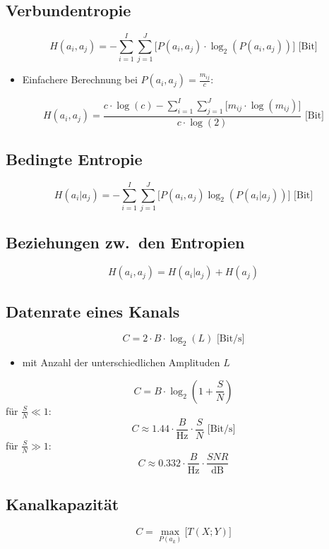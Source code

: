 
\subsection*{Verbundentropie}
\[
    H(a_i, a_j) = -\sum_{i=1}^{I} \sum_{j=1}^{J} \bigg[ P(a_i, a_j) \cdot
    \log_2( P(a_i, a_j) ) \bigg] \mbox{ [Bit]}
\]
\begin{itemize}
	\setlength{\parskip}{0pt}
	\setlength{\itemsep}{0pt plus 1pt}
    \item Einfachere Berechnung bei $P(a_i, a_j) = \frac{m_{ij}}{c}$:
\end{itemize}
\[
    H(a_i, a_j) = \frac{c \cdot \log(c) - \sum\limits_{i=1}^{I} \sum\limits_{j=1}^{J} \bigg[
    m_{ij} \cdot \log( m_{ij} ) \bigg]}{c \cdot \log(2)} \mbox{ [Bit]}
\]

\subsection*{Bedingte Entropie}
\[
    H(a_i | a_j) = - \sum_{i=1}^{I} \sum_{j=1}^{J} \bigg[ P(a_i, a_j)
    \log_2(P(a_i | a_j)) \bigg] \mbox{ [Bit]}
\]

\subsection*{Beziehungen zw.\ den Entropien}
\[
    H(a_i, a_j) = H(a_i | a_j) + H(a_j)
\]

\subsection*{Datenrate eines Kanals}
\[
    C = 2 \cdot B \cdot \log_2(L) \mbox{ [Bit/s]}
\]
\begin{itemize}
	\setlength{\parskip}{0pt}
	\setlength{\itemsep}{0pt plus 1pt}
    \item mit Anzahl der unterschiedlichen Amplituden $ L $
\end{itemize}
\[
    C = B \cdot \log_2 \left( 1 + \frac{S}{N} \right) 
\]
für $ \frac{S}{N} \ll 1 $:
\[
    C \approx 1.44 \cdot \frac{B}{\text{Hz}} \cdot \frac{S}{N} \mbox{ [Bit/s]}
\]
für $ \frac{S}{N} \gg 1 $:
\[
    C \approx 0.332 \cdot \frac{B}{\text{Hz}} \cdot \frac{SNR}{\text{dB}}
\]

\subsection*{Kanalkapazität}
\[
    C = \max_{P(a_k)} \bigg[ T(X; Y) \bigg]
\]

